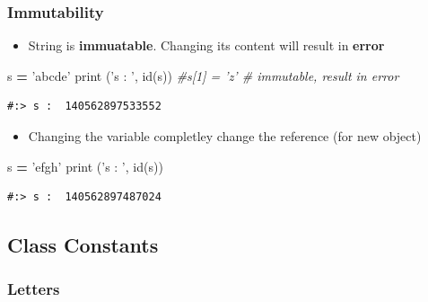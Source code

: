 \documentclass[
]{book}
\newenvironment{Shaded}{\begin{snugshade}}{\end{snugshade}}
\newcommand{\BuiltInTok}[1]{#1}
\newcommand{\CommentTok}[1]{\textcolor[rgb]{0.37,0.37,0.37}{\textit{#1}}}
\newcommand{\NormalTok}[1]{#1}
\newcommand{\OperatorTok}[1]{\textcolor[rgb]{0.43,0.43,0.43}{\textbf{#1}}}
\newcommand{\StringTok}[1]{\textcolor[rgb]{0.5,0.5,0.5}{#1}}
\providecommand{\tightlist}{%
  \setlength{\itemsep}{0pt}\setlength{\parskip}{0pt}}
\begin{document}
\hypertarget{immutability}{%
\subsubsection{Immutability}\label{immutability}}

\begin{itemize}
\tightlist
\item
  String is \textbf{immuatable}. Changing its content will result in \textbf{error}
\end{itemize}

\begin{Shaded}
\begin{Highlighting}[]
\NormalTok{s }\OperatorTok{=} \StringTok{'abcde'}
\BuiltInTok{print}\NormalTok{ (}\StringTok{'s : '}\NormalTok{, }\BuiltInTok{id}\NormalTok{(s))}
\CommentTok{#s[1] = 'z'               # immutable, result in error}
\end{Highlighting}
\end{Shaded}

\begin{verbatim}
#:> s :  140562897533552
\end{verbatim}

\begin{itemize}
\tightlist
\item
  Changing the variable completley change the reference (for new object)
\end{itemize}

\begin{Shaded}
\begin{Highlighting}[]
\NormalTok{s }\OperatorTok{=} \StringTok{'efgh'}
\BuiltInTok{print}\NormalTok{ (}\StringTok{'s : '}\NormalTok{, }\BuiltInTok{id}\NormalTok{(s))}
\end{Highlighting}
\end{Shaded}

\begin{verbatim}
#:> s :  140562897487024
\end{verbatim}

\hypertarget{class-constants}{%
\subsection{Class Constants}\label{class-constants}}

\hypertarget{letters}{%
\subsubsection{Letters}\label{letters}}
\end{document}
